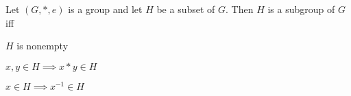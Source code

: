   Let  $(G, *, e)$ is a group and let $H$ be a subset of $G$. 
  Then $H$ is a subgroup of $G$ iff
  \begin{myenum}
  \item $H$ is nonempty
  \item $x, y \in H \implies x * y \in H$
  \item $x \in H \implies x^{-1} \in H$
  \end{myenum}
